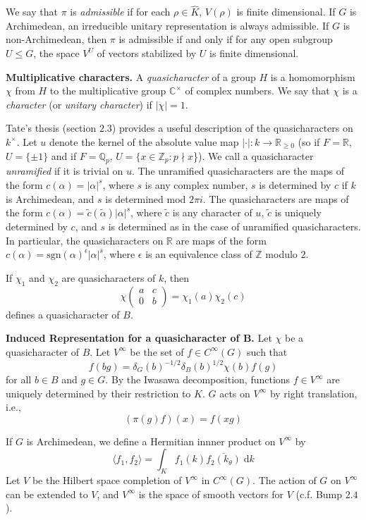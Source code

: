\documentclass[12pt, letterpaper, twoside]
{article}
\newcommand{\ra}{\rightarrow}
\newcommand{\Z}{{\mathbb Z}} %
\newcommand{\Q}{{\mathbb Q}} %
\newcommand{\R}{{\mathbb R}} %
\newcommand{\C}{{\mathbb C}} %
\newcommand{\dd}[1]{\mathrm{d}#1} %
\newcommand{\ol}{\overline}
\begin{document}
We say that $\pi$ is \textit{admissible} if for each $\rho \in \hat{K}$,
$V(\rho)$ is finite dimensional. If $G$ is Archimedean, an irreducible unitary
representation is always admissible. If $G$ is non-Archimedean, then $\pi$ is
admissible if and only if for any open subgroup $U \leq G$, the space $V^U$ of
vectors stabilized by $U$ is finite dimensional.

\textbf{Multiplicative characters.} A \textit{quasicharacter} of a group $H$ is
a homomorphism $\chi$ from $H$ to the multiplicative group $\C^\times$ of
complex numbers. We say that $\chi$ is a \textit{character} (or \textit{unitary
character}) if $|\chi| = 1$. 

Tate's thesis (section $2.3$) provides a useful description of the
quasicharacters on $k^\times$. Let $u$ denote the kernel of the absolute value
map $| \cdot | : k \ra \R_{\geq 0}$ (so if $F = \R$, $U = \{\pm 1\}$ and if $F =
\Q_p$, $U = \{ x \in \Z_p : p \nmid x$\}). We call a quasicharacter
\textit{unramified} if it is trivial on $u$. The unramified quasicharacters are
the maps of the form $c(\alpha) = |\alpha|^s$, where $s$ is any complex number,
$s$ is determined by $c$ if $k$ is Archimedean, and $s$ is determined mod $2\pi
i$. The quasicharacters are maps of the form $c(\alpha) =
\tilde{c}(\tilde{\alpha})|\alpha|^s$, where $\tilde{c}$ is any character of $u$,
$\tilde{c}$ is uniquely determined by $c$, and $s$ is determined as in the case
of unramified quasicharacters. In particular, the quasicharacters on $\R$ are
maps of the form $c(\alpha) = \text{sgn}(\alpha)^\epsilon|\alpha|^s$, where
$\epsilon$ is an equivalence class of $\Z$ modulo $2$.

If $\chi_1$ and $\chi_2$ are quasicharacters of $k$, then
\[\chi \begin{pmatrix} a & c \\ 0 & b \end{pmatrix} = \chi_1(a)\chi_2(c)\]
defines a quasicharacter of $B$.

\textbf{Induced Representation for a quasicharacter of B.} Let $\chi$ be a
quasicharacter of $B$. Let $V^\infty$ be the set of $f \in C^\infty(G)$ such
that
\[f(bg) = \delta_G(b)^{-1/2}\delta_B(b)^{1/2}\chi(b)f(g)\] for all $b \in B$ and
$g \in G$. By the Iwasawa decomposition, functions $f \in V^\infty$ are uniquely
determined by their restriction to $K$. $G$ acts on $V^\infty$ by right
translation, i.e.,
\[(\pi(g)f)(x) = f(xg)\]

If $G$ is Archimedean, we define a Hermitian innner product on $V^\infty$ by
\[\langle f_1, f_2 \rangle = \int_K f_1(k)\ol{f_2(k_\theta)} \; \dd k\] Let $V$
be the Hilbert space completion of $V^\infty$ in $C^\infty(G)$. The action of
$G$ on $V^\infty$ can be extended to $V$, and $V^\infty$ is the space of smooth
vectors for $V$ (c.f. Bump $2.4$).
\end{document}

